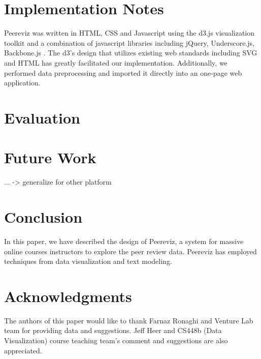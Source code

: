 \documentclass{sigchi}
\begin{document}
\section{Implementation Notes}
Peereviz was written in HTML, CSS and Javascript using the d3.js visualization
toolkit \cite{d3} and a combination of javascript libraries including jQuery,
Underscore.js, Backbone.js \cite{jquery,underscore,backbone}.  The d3’s design that utilizes
existing web standards including SVG and HTML has greatly facilitated our
implementation.  Additionally, we performed data preprocessing and imported it
directly into an one-page web application.


\section{Evaluation}

\section{Future Work}
... -> generalize for other platform

\section{Conclusion}

In this paper, we have described the design of Peereviz, a system for massive online courses
instructors to explore the peer review data.   Peereviz has employed techniques
from data visualization and text modeling.

\section{Acknowledgments}
The authors of this paper would like to thank Farnaz Ronaghi and Venture Lab
team for providing data and suggestions.
Jeff Heer and CS448b (Data Visualization) course teaching team's comment
and suggestions are also appreciated.

%
%
%
%
%



\end{document}
